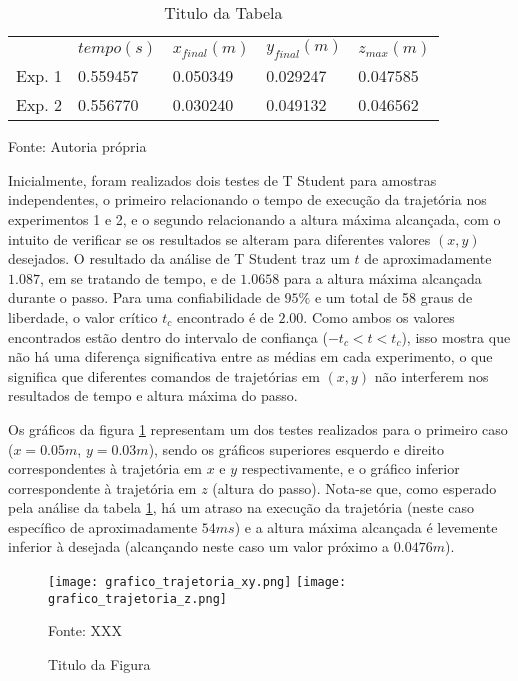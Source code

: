 \documentclass[../main.tex]{subfiles}
\begin{document}
  \begin{table}[h]
    \caption{Titulo da Tabela}
    \centering
      \begin{tabular}{lllll}
             & $tempo (s)$ & $x_{final}(m)$ & $y_{final}(m)$ & $z_{max}(m)$ \\
      Exp. 1 & 0.559457 & 0.050349 & 0.029247 & 0.047585 \\
      Exp. 2 & 0.556770 & 0.030240 & 0.049132 & 0.046562      
      \end{tabular}

    Fonte: Autoria própria
    \label{tab:trajetoria}
  \end{table}

  Inicialmente, foram realizados dois testes de T Student para amostras independentes, o primeiro relacionando o tempo de execução da trajetória nos experimentos 1 e 2, e o segundo relacionando a altura máxima alcançada, com o intuito de verificar se os resultados se alteram para diferentes valores $(x, y)$ desejados. O resultado da análise de T Student traz um $t$ de aproximadamente $1.087$, em se tratando de tempo, e de $1.0658$ para a altura máxima alcançada durante o passo. Para uma confiabilidade de $95\%$ e um total de 58 graus de liberdade, o valor crítico $t_c$ encontrado é de $2.00$. Como ambos os valores encontrados estão dentro do intervalo de confiança ($-t_c < t < t_c$), isso mostra que não há uma diferença significativa entre as médias em cada experimento, o que significa que diferentes comandos de trajetórias em $(x, y)$ não interferem nos resultados de tempo e altura máxima do passo.
  
  Os gráficos da figura \ref{fig:grafico_trajetoria_xyz} representam um dos testes realizados para o primeiro caso ($x=0.05m$, $y=0.03m$), sendo os gráficos superiores esquerdo e direito correspondentes à trajetória em $x$ e $y$ respectivamente, e o gráfico inferior correspondente à trajetória em $z$ (altura do passo). Nota-se que, como esperado pela análise da tabela \ref{tab:trajetoria}, há um atraso na execução da trajetória (neste caso específico de aproximadamente $54ms$) e a altura máxima alcançada é levemente inferior à desejada (alcançando neste caso um valor próximo a $0.0476m$).

  \begin{figure}[h]
    \centering
    \caption{Titulo da Figura}
    \texttt{[image: grafico\_trajetoria\_xy.png]}
    \texttt{[image: grafico\_trajetoria\_z.png]}
    
    Fonte: XXX
    \label{fig:grafico_trajetoria_xyz}
  \end{figure}
\end{document}
